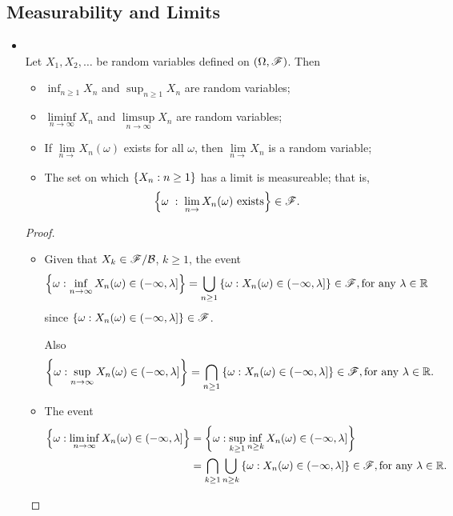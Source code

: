 \documentclass[11pt]{article}
\begin{document}
\subsection{Measurability and Limits}
\begin{itemize}
 \item \begin{proposition} \citep{resnick2013probability}\\
Let $X_{1}, X_2, \ldots$ be random variables defined on $(\Omega, {\mathscr F})$. Then 
\begin{itemize}
\item $\inf_{n\ge 1}X_{n}$ and $\sup_{n\ge 1}X_{n}$ are random variables;
\item $\liminf\limits_{n\rightarrow \infty}X_{n}$ and $\limsup\limits_{n\rightarrow \infty}X_{n}$ are random variables;
\item If $\lim\limits_{n\rightarrow}X_{n}(\omega)$ exists for all $\omega$, then $\lim\limits_{n\rightarrow}X_{n}$ is a random variable;
\item The set on which $\left\{X_{n}: n\ge 1\right\}$ has a limit is measureable; that is,
\begin{align*}
\left\{\omega\;:\; \lim\limits_{n\rightarrow}X_{n}(\omega) \text{ exists} \right\} \in {\mathscr F}.
\end{align*}
\end{itemize}
\end{proposition}
\begin{proof}
\begin{itemize}
\item Given that $X_{k}\in {\mathscr F}/{\mathcal B}$, $k\ge 1$, the event 
\begin{align*}
\left\{\omega: \inf\limits_{n\rightarrow \infty}X_{n}(\omega)\in (-\infty, \lambda] \right\}&=  \bigcup_{n\ge 1}\left\{\omega: X_{n}(\omega)\in (-\infty, \lambda] \right\} \in {\mathscr F}, \text{for any }\lambda \in {\mathbb R}
\end{align*}
since $\left\{\omega: X_{n}(\omega)\in (-\infty, \lambda] \right\} \in {\mathscr F}$.

Also
\begin{align*}
\left\{\omega: \sup\limits_{n\rightarrow \infty}X_{n}(\omega)\in (-\infty, \lambda] \right\}&=  \bigcap_{n\ge 1}\left\{\omega: X_{n}(\omega)\in (-\infty, \lambda] \right\} \in {\mathscr F}, \text{for any }\lambda \in {\mathbb R}.\\
\end{align*}

\item The event 
\begin{align*}
\left\{\omega: \liminf\limits_{n\rightarrow \infty}X_{n}(\omega)\in (-\infty, \lambda] \right\}&= \left\{\omega: \sup\limits_{k\ge 1}\inf_{n\ge k} X_{n}(\omega) \in (-\infty, \lambda] \right\}\\
&= \bigcap_{k\ge 1}\bigcup_{n\ge k}\left\{\omega: X_{n}(\omega)\in (-\infty, \lambda] \right\} \in {\mathscr F}, \text{for any }\lambda \in {\mathbb R}.
\end{align*}


\end{itemize}
\end{proof}
\end{itemize}
\end{document}
